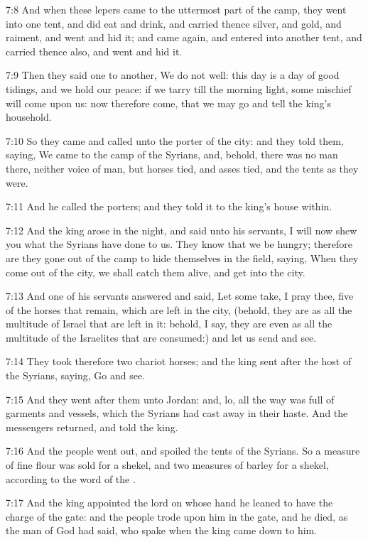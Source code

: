 7:8 And when these lepers came to the uttermost part of the camp, they
went into one tent, and did eat and drink, and carried thence silver,
and gold, and raiment, and went and hid it; and came again, and
entered into another tent, and carried thence also, and went and hid
it.

7:9 Then they said one to another, We do not well: this day is a day
of good tidings, and we hold our peace: if we tarry till the morning
light, some mischief will come upon us: now therefore come, that we
may go and tell the king's household.

7:10 So they came and called unto the porter of the city: and they
told them, saying, We came to the camp of the Syrians, and, behold,
there was no man there, neither voice of man, but horses tied, and
asses tied, and the tents as they were.

7:11 And he called the porters; and they told it to the king's house
within.

7:12 And the king arose in the night, and said unto his servants, I
will now shew you what the Syrians have done to us. They know that we
be hungry; therefore are they gone out of the camp to hide themselves
in the field, saying, When they come out of the city, we shall catch
them alive, and get into the city.

7:13 And one of his servants answered and said, Let some take, I pray
thee, five of the horses that remain, which are left in the city,
(behold, they are as all the multitude of Israel that are left in it:
behold, I say, they are even as all the multitude of the Israelites
that are consumed:) and let us send and see.

7:14 They took therefore two chariot horses; and the king sent after
the host of the Syrians, saying, Go and see.

7:15 And they went after them unto Jordan: and, lo, all the way was
full of garments and vessels, which the Syrians had cast away in their
haste. And the messengers returned, and told the king.

7:16 And the people went out, and spoiled the tents of the Syrians. So
a measure of fine flour was sold for a shekel, and two measures of
barley for a shekel, according to the word of the \LORD.

7:17 And the king appointed the lord on whose hand he leaned to have
the charge of the gate: and the people trode upon him in the gate, and
he died, as the man of God had said, who spake when the king came down
to him.

